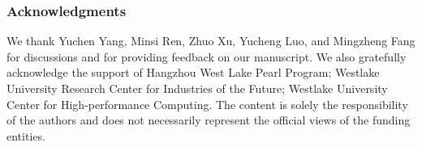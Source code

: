 \documentclass{article} %
\theoremstyle{plain}
\theoremstyle{definition}
\begin{document}
\subsubsection*{Acknowledgments}
We thank Yuchen Yang, Minsi Ren, Zhuo Xu, Yucheng Luo, and Mingzheng Fang for discussions and for providing feedback on our manuscript.
We also gratefully acknowledge the support of Hangzhou West Lake Pearl Program; Westlake University Research Center for Industries of the Future; Westlake University Center for High-performance Computing.
The content is solely the responsibility of the authors and does not necessarily represent the official views of the funding entities.




\appendix

\end{document}
